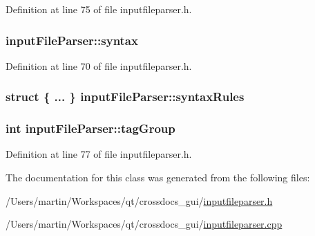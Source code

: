 Definition at line 75 of file inputfileparser.\+h.

\hypertarget{classinput_file_parser_a9528ecb148895886207571dcaa920626}{
\subsubsection[{syntax}]{ input\+File\+Parser\+::syntax\hspace{0.3cm}{\ttfamily [private]}}}\label{classinput_file_parser_a9528ecb148895886207571dcaa920626}


Definition at line 70 of file inputfileparser.\+h.

\hypertarget{classinput_file_parser_a47a7cdb8d77cae8fc1e81e86afb9ff31}{
\subsubsection[{syntax\+Rules}]{\setlength{\rightskip}{0pt plus 5cm}struct \{ ... \}   input\+File\+Parser\+::syntax\+Rules\hspace{0.3cm}{\ttfamily [private]}}}\label{classinput_file_parser_a47a7cdb8d77cae8fc1e81e86afb9ff31}
\hypertarget{classinput_file_parser_ab142598be7ed31c434e5230c3feed1c1}{
\subsubsection[{tag\+Group}]{\setlength{\rightskip}{0pt plus 5cm}int input\+File\+Parser\+::tag\+Group}}\label{classinput_file_parser_ab142598be7ed31c434e5230c3feed1c1}


Definition at line 77 of file inputfileparser.\+h.



The documentation for this class was generated from the following files\+:\begin{DoxyCompactItemize}
\item 
/\+Users/martin/\+Workspaces/qt/crossdocs\+\_\+gui/\hyperlink{inputfileparser_8h}{inputfileparser.\+h}\item 
/\+Users/martin/\+Workspaces/qt/crossdocs\+\_\+gui/\hyperlink{inputfileparser_8cpp}{inputfileparser.\+cpp}\end{DoxyCompactItemize}
